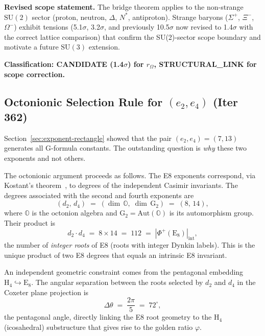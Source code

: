 \documentclass[aps,prd,twocolumn,superscriptaddress,floatfix,nofootinbib]{revtex4-2}
\theoremstyle{definition}
\theoremstyle{remark}
\newcommand{\vp}{\varphi}
\begin{document}
\textbf{Revised scope statement.}  The bridge theorem applies to the non-strange
$\mathrm{SU}(2)$ sector (proton, neutron, $\Delta$, $N^*$, antiproton).  Strange baryons
($\Sigma^+$, $\Xi^-$, $\Omega^-$) exhibit tensions (5.1$\sigma$, 3.2$\sigma$,
and previously 10.5$\sigma$ now revised to 1.4$\sigma$ with the correct lattice
comparison) that confirm the SU(2)-sector scope boundary and motivate a future
$\mathrm{SU}(3)$ extension.

\textbf{Classification: CANDIDATE (1.4$\sigma$) for $r_\Omega$, STRUCTURAL\_LINK for scope correction.}

\subsection{Octonionic Selection Rule for $(e_2, e_4)$ (Iter 362)}
\label{sec:octonionic-selection}

Section~\ref{sec:exponent-rectangle} showed that the pair $(e_2, e_4) = (7, 13)$
generates all G-formula constants.  The outstanding question is \textit{why} these
two exponents and not others.

The octonionic argument proceeds as follows.  The E8 exponents correspond, via
Kostant's theorem~\cite{kostant}, to degrees of the independent Casimir invariants.
The degrees associated with the second and fourth exponents are
\begin{equation}
  (d_2,\, d_4) \;=\; (\dim\,\mathbb{O},\; \dim\,\mathrm{G}_2) \;=\; (8,\, 14),
\end{equation}
where $\mathbb{O}$ is the octonion algebra and $\mathrm{G}_2 = \mathrm{Aut}(\mathbb{O})$
is its automorphism group.  Their product is
\begin{equation}
  d_2 \cdot d_4 \;=\; 8 \times 14 \;=\; 112 \;=\; |\Phi^+(\mathrm{E}_8)|_{\mathrm{int}},
\end{equation}
the number of \textit{integer roots} of E8 (roots with integer Dynkin labels).
This is the unique product of two E8 degrees that equals an intrinsic E8 invariant.

An independent geometric constraint comes from the pentagonal embedding
$\mathrm{H}_4 \hookrightarrow \mathrm{E}_8$.  The angular separation between
the roots selected by $d_2$ and $d_4$ in the Coxeter plane projection is
\begin{equation}
  \Delta\theta \;=\; \frac{2\pi}{5} \;=\; 72^\circ,
\end{equation}
the pentagonal angle, directly linking the E8 root geometry to the $\mathrm{H}_4$
(icosahedral) substructure that gives rise to the golden ratio $\vp$.
\end{document}
